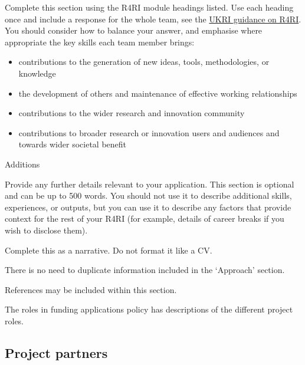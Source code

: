 \documentclass[11pt]{article}
\newenvironment{instruction}{%
    \begin{tcolorbox}[breakable,colback=red!5,colframe=red,title=Instruction]%
	}{%
    	\end{tcolorbox}%
	}
\begin{document}
\begin{instruction}
Complete this section using the R4RI module headings listed. Use each heading
once and include a response for the whole team, see the
\href{https://www.ukri.org/apply-for-funding/before-you-apply/resume-for-research-and-innovation-r4ri-guidance/}{UKRI
guidance on R4RI}. You should consider how to balance your answer, and
emphasise where appropriate the key skills each team member brings:

\begin{itemize}

	\item contributions to the generation of new ideas, tools, methodologies, or
knowledge

	\item the development of others and maintenance of effective working relationships

	\item contributions to the wider research and innovation community

	\item contributions to broader research or innovation users and audiences and
towards wider societal benefit

\end{itemize}

Additions

Provide any further details relevant to your application. This section is
optional and can be up to 500 words. You should not use it to describe
additional skills, experiences, or outputs, but you can use it to describe any
factors that provide context for the rest of your R4RI (for example, details of
career breaks if you wish to disclose them).

Complete this as a narrative. Do not format it like a CV.

There is no need to duplicate information included in the ‘Approach’ section.

References may be included within this section.

The roles in funding applications policy has descriptions of the different
project roles.

\end{instruction}

% 

\pagebreak
\subsection{Project partners}
\end{document}
